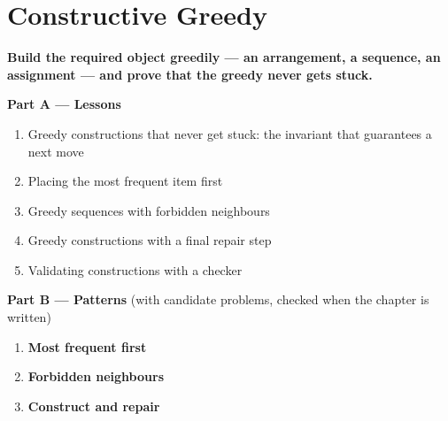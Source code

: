 \chapter{Constructive Greedy}
\label{ch:constructive}

\begin{tcolorbox}[enhanced, colback=white, colframe=secondaryblue, boxrule=1pt, arc=2mm]
\textbf{\large\textcolor{primaryblue}{Build the required object greedily --- an arrangement, a sequence, an assignment --- and prove that the greedy never gets stuck.}}
\end{tcolorbox}


\begin{plannedbox}
\textbf{Part A --- Lessons}
\begin{enumerate}[leftmargin=*, label=\textbf{A\arabic*.}, itemsep=1pt]
    \item Greedy constructions that never get stuck: the invariant that guarantees a next move
    \item Placing the most frequent item first
    \item Greedy sequences with forbidden neighbours
    \item Greedy constructions with a final repair step
    \item Validating constructions with a checker
\end{enumerate}
\textbf{Part B --- Patterns} (with candidate problems, checked when the chapter is written)
\begin{enumerate}[leftmargin=*, label=\textbf{P\arabic*.}, itemsep=1pt]
    \item \textbf{Most frequent first}
    \item \textbf{Forbidden neighbours}
    \item \textbf{Construct and repair}
\end{enumerate}
\end{plannedbox}
